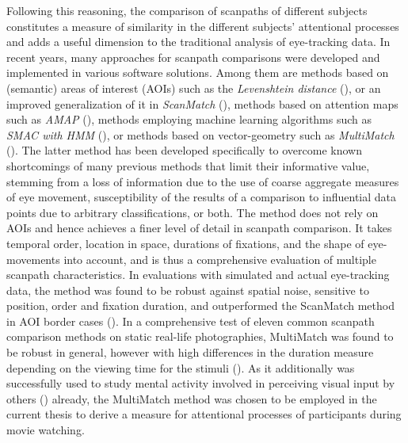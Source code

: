 \documentclass[a4paper, 12pt]{scrreprt}
\begin{document}
Following this reasoning, the comparison of scanpaths of different subjects constitutes a measure of similarity in the different subjects’ attentional processes and adds a useful dimension to the traditional analysis of eye-tracking data. In recent years, many approaches for scanpath comparisons were developed and implemented in various software solutions. Among them are methods based on (semantic) areas of interest (AOIs) such as the \textit{Levenshtein distance} (\cite{levenshtein1966binary}), or an improved generalization of it in \textit{ScanMatch} (\cite{cristino2010scanmatch}), methods based on attention maps such as \textit{AMAP} (\cite{ouerhani2004empirical}), methods employing machine learning algorithms such as \textit{SMAC with HMM} (\cite{coutrot2018scanpath}), or methods based on vector-geometry such as \textit{MultiMatch} (\cite{jarodzka2010vector}). The latter method has been developed specifically to overcome known shortcomings of many previous methods that limit their informative value, stemming from a loss of information due to the use of coarse aggregate measures of eye movement, susceptibility of the results of a comparison to influential data points due to arbitrary classifications, or both. The method does not rely on AOIs and hence achieves a finer level of detail in scanpath comparison. It takes temporal order, location in space, durations of fixations, and the shape of eye-movements into account, and is thus a comprehensive evaluation of multiple scanpath characteristics. In evaluations with simulated and actual eye-tracking data, the method was found to be robust against spatial noise, sensitive to position, order and fixation duration, and outperformed the ScanMatch method in AOI border cases (\cite{dewhurst2012depends}). In a comprehensive test of eleven common scanpath comparison methods on static real-life photographies, MultiMatch was found to be robust in general, however with high differences in the duration measure depending on the viewing time for the stimuli (\cite{anderson2015comparison}). As it additionally was successfully used to study mental activity involved in perceiving visual input by others (\cite{french2017evaluation}) already, the MultiMatch method was chosen to be employed in the current thesis to derive a measure for attentional processes of participants during movie watching. 
\end{document}
